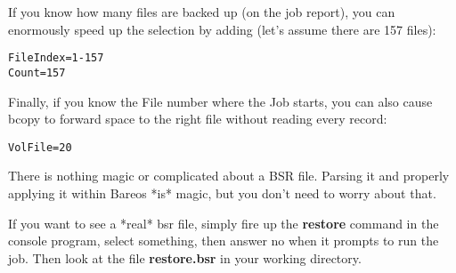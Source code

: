 If you know how many files are backed up (on the job report), you can
enormously speed up the selection by adding (let's assume there are 157
files):

\footnotesize
\begin{verbatim}
FileIndex=1-157
Count=157
\end{verbatim}
\normalsize

Finally, if you know the File number where the Job starts, you can also cause
bcopy to forward space to the right file without reading every record:

\footnotesize
\begin{verbatim}
VolFile=20
\end{verbatim}
\normalsize

There is nothing magic or complicated about a BSR file. Parsing it and
properly applying it within Bareos *is* magic, but you don't need to worry
about that.

If you want to see a *real* bsr file, simply fire up the {\bf restore} command
in the console program, select something, then answer no when it prompts to
run the job. Then look at the file {\bf restore.bsr} in your working
directory.
